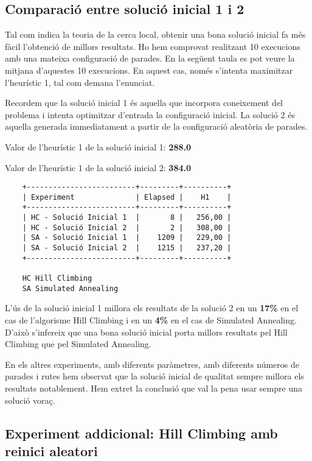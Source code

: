 
\subsection{Comparació entre solució inicial 1 i 2}
Tal com indica la teoria de la cerca local, obtenir una bona solució inicial fa més fàcil l'obtenció de millors resultats. Ho hem comprovat realitzant 10 execucions amb una mateixa configuració de parades. En la següent taula es pot veure la mitjana d'aquestes 10 execucions. En aquest cas, només s'intenta maximitzar l'heurístic 1, tal com demana l'enunciat.

Recordem que la solució inicial 1 és aquella que incorpora coneixement del problema i intenta optimitzar d'entrada la configuració inicial. La solució 2 és aquella generada immediatament a partir de la configuració aleatòria de parades.

Valor de l'heurístic 1 de la solució inicial 1: \textbf{288.0}

Valor de l'heurístic 1 de la solució inicial 2: \textbf{384.0}

\begin{verbatim}
	+-------------------------+---------+----------+
	| Experiment              | Elapsed |    H1    |
	+-------------------------+---------+----------+
	| HC - Solució Inicial 1  |       8 |   256,00 |
	| HC - Solució Inicial 2  |       2 |   308,00 |	
	| SA - Solució Inicial 1  |    1209 |   229,00 |
	| SA - Solució Inicial 2  |    1215 |   237,20 |
	+-------------------------+---------+----------+
	
	HC Hill Climbing
	SA Simulated Annealing
\end{verbatim}
		
L'ús de la solució inicial 1 millora els resultats de la solució 2 en un \textbf{17\%} en el cas de l'algorisme Hill Climbing i en un \textbf{4\%} en el cas de Simulated Annealing. D'això s'infereix que una bona solució inicial porta millors resultats pel Hill Climbing que pel Simulated Annealing. 

En els altres experiments, amb diferents paràmetres, amb diferents números de parades i rutes hem observat que la solució inicial de qualitat sempre millora els resultats notablement. Hem extret la conclusió que val la pena usar sempre una solució voraç. 

\subsection{Experiment addicional: Hill Climbing amb reinici aleatori}

